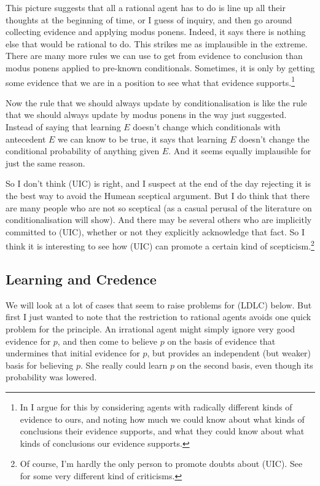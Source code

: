 \noindent This picture suggests that all a rational agent has to do is line up all their thoughts at the beginning of time, or I guess of inquiry, and then go around collecting evidence and applying modus ponens. Indeed, it says there is nothing else that would be rational to do. This strikes me as implausible in the extreme. There are many more rules we can use to get from evidence to conclusion than modus ponens applied to pre-known conditionals. Sometimes, it is only by getting some evidence that we are in a position to see what that evidence supports.\footnote{In \citep{Weatherson2007} I argue for this by considering agents with radically different kinds of evidence to ours, and noting how much we could know about what kinds of conclusions their evidence supports, and what they could know about what kinds of conclusions our evidence supports.}

Now the rule that we should always update by conditionalisation is like the rule that we should always update by modus ponens in the way just suggested. Instead of saying that learning $E$ doesn't change which conditionals with antecedent $E$ we can know to be true, it says that learning $E$ doesn't change the conditional probability of anything given $E$. And it seems equally implausible for just the same reason.

So I don't think (UIC) is right, and I suspect at the end of the day rejecting it is the best way to avoid the Humean sceptical argument. But I do think that there are many people who are not so sceptical (as a casual perusal of the literature on conditionalisation will show). And there may be several others who are implicitly committed to (UIC), whether or not they explicitly acknowledge that fact. So I think it is interesting to see how (UIC) can promote a certain kind of scepticism.\footnote{Of course, I'm hardly the only person to promote doubts about (UIC). See \citet{Arntzenius2003-ARNSPF} for some very different kind of criticisms.}

\subsection{Learning and Credence}

We will look at a lot of cases that seem to raise problems for (LDLC) below. But first I just wanted to note that the restriction to rational agents avoids one quick problem for the principle. An irrational agent might simply ignore very good evidence for $p$, and then come to believe $p$ on the basis of evidence that undermines that initial evidence for $p$, but provides an independent (but weaker) basis for believing $p$. She really could learn $p$ on the second basis, even though its probability was lowered. 

